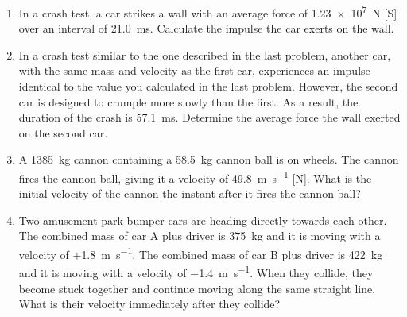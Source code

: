 \begin{enumerate}[itemsep=6pt]
\item In a crash test, a car strikes a wall with an average force of 
  \SI{1.23e7}{\newton} [S] over an interval of \SI{21.0}{\milli\second}.
  Calculate the impulse the car exerts on the wall.
  
\item In a crash test similar to the one described in the last problem, another
  car, with the same mass and velocity as the first car, experiences an impulse
  identical to the value you calculated in the last problem. However, the
  second car is designed to crumple more slowly than the first. As a result,
  the duration of the crash is \SI{57.1}{\milli\second}. Determine the average
  force the wall exerted on the second car.
  
\item A \SI{1385}{\kilo\gram} cannon containing a \SI{58.5}{\kilo\gram} cannon
  ball is on wheels. The cannon fires the cannon ball, giving it a velocity of
  \SI{49.8}{\metre\per\second} [N]. What is the initial velocity of the cannon
  the instant after it fires the cannon ball?
 
\item Two amusement park bumper cars are heading directly towards each other.
  The combined mass of car A plus driver is \SI{375}{\kilo\gram} and it is
  moving with a velocity of $+$\SI{1.8}{\metre\per\second}. The combined mass
  of car B plus driver is \SI{422}{\kilo\gram} and it is moving with a velocity
  of \SI{-1.4}{\metre\per\second}. When they collide, they become stuck
  together and continue moving along the same straight line. What is their
  velocity immediately after they collide?


\end{enumerate}

